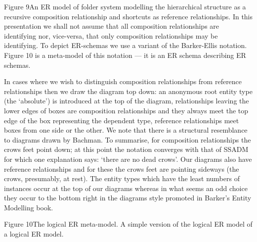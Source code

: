 Figure 9An ER model of folder system modelling the hierarchical structure as a recursive composition relationship and shortcuts as reference relationships.
In this presentation we shall not assume that all composition relationships are identifying nor, vice-versa, that only composition relationships may be identifying. To depict ER-schemas we use a variant of the Barker-Ellis notation. Figure 10 is a meta-model of this notation — it is an ER schema describing ER schemas.

In cases where we wish to distinguish composition relationships from reference relationships then we draw the diagram top down: an anonymous root entity type (the ‘absolute’) is introduced at the top of the diagram, relationships leaving the lower edges of boxes are composition relationships and they always meet the top edge of the box representing the dependent type, reference relationships meet boxes from one side or the other. We note that there is a structural resemblance to diagrams drawn by Bachman. To summarise, for composition relationships the crows feet point down; at this point the notation converges with that of SSADM for which one explanation says: ‘there are no dead crows’. Our diagrams also have reference relationships and for these the crows feet are pointing sideways (the crows, presumably, at rest). The entity types which have the least numbers of instances occur at the top of our diagrams whereas in what seems an odd choice they occur to the bottom right in the diagrams style promoted in Barker's Entity Modelling book.


Figure 10The logical ER meta-model. A simple version of the logical ER model of a logical ER model.





